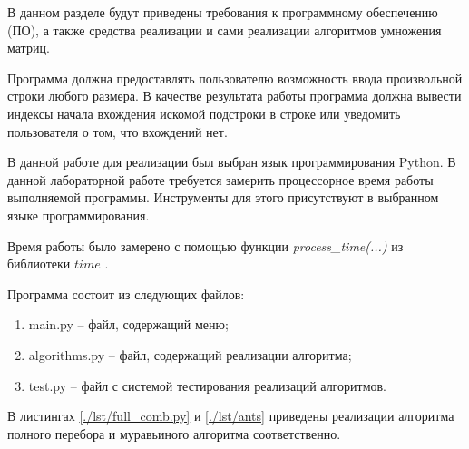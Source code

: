\label{cha:impl}

В данном разделе будут приведены требования к программному обеспечению (ПО), а также средства реализации и сами реализации алгоритмов умножения матриц.

Программа должна предоставлять пользователю возможность ввода произвольной строки любого размера. В качестве результата работы программа должна вывести индексы начала вхождения искомой подстроки в строке или уведомить пользователя о том, что вхождений нет.


В данной работе для реализации был выбран язык программирования Python. 
В данной лабораторной работе требуется замерить процессорное время работы выполняемой программы. 
Инструменты для этого присутствуют в выбранном языке программирования.

Время работы было замерено с помощью функции \textit{process\_time(...)} из библиотеки $time$ \cite{python-lang-time}.


Программа состоит из следующих файлов:
\begin{enumerate}
	\item main.py -- файл, содержащий меню;
	\item algorithms.py -- файл, содержащий реализации алгоритма;
	\item test.py -- файл с системой тестирования реализаций алгоритмов.
\end{enumerate}


В листингах \ref{./lst/full_comb.py} и \ref{./lst/ants} приведены реализации алгоритма полного перебора и муравьиного алгоритма соответственно.


